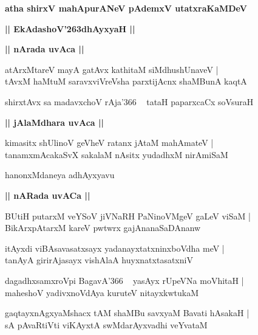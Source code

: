 \documentclass[twoside,12pt,openright]{book}
\def\S{\char'263}
\newcounter{shloka}[chapter]
\def\uvaca#1{\centerline{{\large\textbf{#1}}}}
\begin{document}
\begin{center}
{\LARGE\bfseries atha shirxV mahApurANeV pAdemxV utatxraKaMDeV} 
\end{center}

\begin{center}
{\LARGE\bfseries  || EkAdashoV\S dhAyxyaH ||}
\end{center}

\uvaca{|| nArada uvAca ||}

\begin{shloka}%
atArxMtareV mayA gatAvx kathitaM siMdhushUnaveV |\\
tAvxM haMtuM saravxviVreVsha parxtijAcnx shaMBunA kaqtA
\end{shloka}

\begin{shloka}%
shirxtAvx sa madavxchoV rAja\char'366 ~ tataH paparxcaCx soVsuraH 
\end{shloka}

\uvaca{|| jAlaMdhara uvAca ||}

\begin{shloka}%
kimasitx shUlinoV geVheV ratanx jAtaM mahAmateV |\\
tanamxmAcakaSvX sakalaM nAsitx yudadhxM nirAmiSaM 
\end{shloka}

\begin{center}
hanonxMdaneya adhAyxyavu
\end{center}

\uvaca{|| nARada uvACa ||}

\begin{shloka}%
BUtiH putarxM veYSoV jiVNaRH PaNinoVMgeV gaLeV viSaM |\\
BikArxpAtarxM kareV pwtwrx gajAnanaSaDAnanw
\end{shloka}

\begin{shloka}%
itAyxdi viBAsavasatxsayx yadanayxtatxninxboVdha meV |\\
tanAyA girirAjasayx vishAlaA huyxnatxtasatxniV 
\end{shloka}

\begin{shloka}%
dagadhxsamxroVpi BagavA\char'366 ~ yasAyx rUpeVNa moVhitaH |\\
maheshoV yadivxnoVdAya kuruteV nitayxkwtukaM 
\end{shloka}

\begin{shloka}%
gaqtayxnAgxyaMshacx tAM shaMBu savxyaM Bavati hAsakaH |\\
sA pAvaRtiVti viKAyxtA swMdarAyxvadhi veYvataM
\end{shloka}
\end{document}
